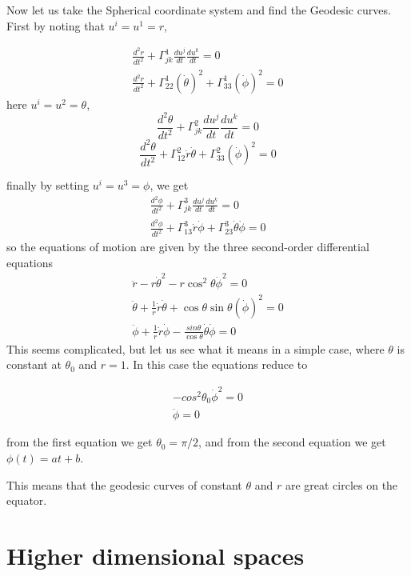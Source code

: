 {Now let us take the Spherical coordinate system and find the Geodesic curves. First by
noting that $u^i=u^1=r$,

\begin{eqnarray}
    \frac{d^2r}{dt^2} + \Gamma_{jk}^1\frac{du^j}{dt}\frac{du^k}{dt} = 0 \\
    \frac{d^2r}{dt^2} + \Gamma_{22}^1(\dot{\theta})^2
    + \Gamma_{33}^1(\dot{\phi})^2 = 0
\end{eqnarray}
here $u^i=u^2=\theta$,
$$
    \frac{d^2\theta}{dt^2} + \Gamma_{jk}^2\frac{du^j}{dt}\frac{du^k}{dt} = 0
$$
$$
    \frac{d^2\theta}{dt^2} + \Gamma_{12}^2\dot{r}\dot{\theta}
    + \Gamma_{33}^2(\dot{\phi})^2 = 0
$$

finally by setting $u^i=u^3=\phi$, we get
\begin{eqnarray*} 
    \frac{d^2\phi}{dt^2} + \Gamma_{jk}^3\frac{du^j}{dt}\frac{du^k}{dt} = 0 \\
    \frac{d^2\phi}{dt^2} + \Gamma_{13}^3\dot{r}\dot{\phi}
    + \Gamma_{23}^3\dot{\theta}\dot{\phi} = 0
\end{eqnarray*}
so the equations of motion are given by the three second-order differential
equations
\begin{eqnarray*} 
    \ddot{r} -r\dot{\theta}^2 -r \cos^2\theta\dot{\phi}^2 = 0\\
    \ddot{\theta} + \frac{1}{r}\dot{r}\dot{\theta}
    + \cos\theta\sin\theta(\dot{\phi})^2 = 0 \\
    \ddot{\phi} + \frac{1}{r}\dot{r}\dot{\phi}
    - \frac{sin\theta}{\cos\theta}\dot{\theta}\dot{\phi} = 0
\end{eqnarray*}
This seems complicated, but let us see what it means in a simple case, where $\theta$ is 
constant at $\theta_0$ and $r=1$. In this case the equations reduce to

\begin{eqnarray}
    -cos^2\theta_0\dot{\phi}^2 = 0\\
    \ddot{\phi}  = 0
\end{eqnarray}

from the first equation we get $\theta_0=\pi/2$, and from the second equation we get
$\phi(t) = at+b$.

This means that the geodesic curves of constant $\theta$ and $r$ are great circles on the 
equator.


\section{Higher dimensional spaces}
}
